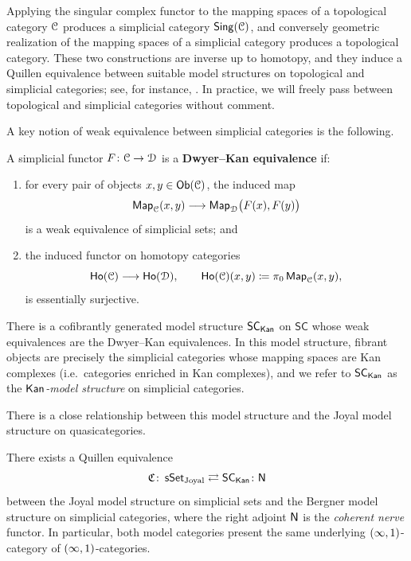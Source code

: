 \begin{remark}
  Applying the singular complex functor to the mapping spaces of a topological
  category $\mathcal C$ produces a simplicial category $\operatorname{\mathsf{Sing}}(\mathcal C)$, and conversely
  geometric realization of the mapping spaces of a simplicial category
  produces a topological category.  These two constructions are inverse up to
  homotopy, and they induce a Quillen equivalence between suitable model
  structures on topological and simplicial categories; see, for instance,
  \cite[Ch.~2]{Ber18}.  In practice, we will freely pass between topological
  and simplicial categories without comment.
\end{remark}

A key notion of weak equivalence between simplicial categories is the
following.

\begin{definition}
  A simplicial functor $F \colon \mathcal C \to \mathcal D$ is a
  \textbf{Dwyer--Kan equivalence} if:
  \begin{enumerate}
    \item for every pair of objects $x,y \in \operatorname{{\sf Ob}}(\mathcal C)$, the induced map
      \[
        \operatorname{{\sf Map}}_{\mathcal C}(x,y) \longrightarrow \operatorname{{\sf Map}}_{\mathcal D}\bigl(F(x),F(y)\bigr)
      \]
      is a weak equivalence of simplicial sets; and
    \item the induced functor on homotopy categories
      \[
        \operatorname{\sf Ho}(\mathcal C) \longrightarrow \operatorname{\sf Ho}(\mathcal D),
        \qquad
        \operatorname{\sf Ho}(\mathcal C)(x,y) \coloneqq \pi_0\operatorname{{\sf Map}}_{\mathcal C}(x,y),
      \]
      is essentially surjective.
  \end{enumerate}
\end{definition}

\begin{theorem}[Bergner]
  There is a cofibrantly generated model structure
  $\mathsf{SC}_{\operatorname{\mathsf{Kan}}}$ on $\mathsf{SC}$ whose weak equivalences are the Dwyer--Kan
  equivalences.  In this model structure, fibrant objects are precisely the
  simplicial categories whose mapping spaces are Kan complexes (i.e.~categories
  enriched in Kan complexes), and we refer to $\mathsf{SC}_{\operatorname{\mathsf{Kan}}}$ as the
  \emph{$\operatorname{\mathsf{Kan}}$-model structure} on simplicial categories.
\end{theorem}

There is a close relationship between this model structure and the Joyal model
structure on quasicategories.

\begin{theorem}
  There exists a Quillen equivalence
  \[
    \mathfrak{C} \colon \operatorname{\sf sSet}_{\mathrm{Joyal}}
    \rightleftarrows
    \mathsf{SC}_{\operatorname{\mathsf{Kan}}} \colon \mathsf N
  \]
  between the Joyal model structure on simplicial sets and the Bergner model
  structure on simplicial categories, where the right adjoint $\mathsf N$ is the
  \emph{coherent nerve} functor.  In particular, both model categories
  present the same underlying $(\operatorname{\infty},1)$-category of $(\operatorname{\infty},1)$-categories.
\end{theorem}

